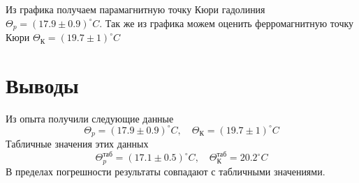 \documentclass{article}
\begin{document}
Из графика получаем парамагнитную точку Кюри гадолиния
$\Theta_p = (17.9 \pm 0.9) ^\circ C$. Так же из графика можем оценить ферромагнитную 
точку Кюри $\Theta_{К} = (19.7 \pm 1) ^\circ C$

\newpage
\section{Выводы}
Из опыта получили следующие данные
\begin{equation}
    \Theta_p = (17.9 \pm 0.9) ^\circ C \mathrm{,}\quad \Theta_{К} = (19.7 \pm 1) ^\circ C
\end{equation}
Табличные значения этих данных
\begin{equation}
    \Theta_p^{таб} = (17.1 \pm 0.5) ^\circ C \mathrm{,}\quad
    \Theta_{К}^{таб} = 20.2 ^\circ C
\end{equation}
В пределах погрешности результаты совпадают с табличными значениями.
\end{document}
